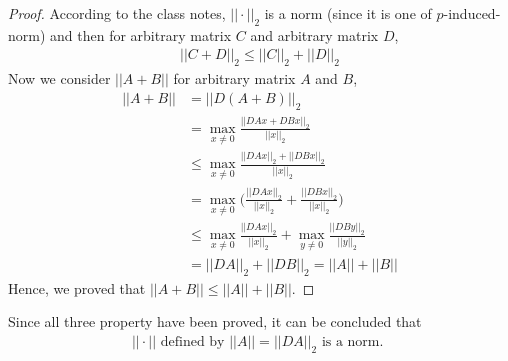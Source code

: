 \documentclass[11pt,a4paper]{article}
\begin{document}
\begin{proof}
    According to the class notes, $||\cdot||_2$ is a norm (since it is one of
    $p$-induced-norm) and then for arbitrary matrix $C$ and arbitrary matrix $D$,
    \begin{align}
        || C + D ||_2 \leq || C ||_2 + || D ||_2  \label{betaa}
    \end{align}
    Now we consider $|| A + B||$ for arbitrary matrix $A$ and $B$,
    \begin{align}     
        || A + B || &= || D (A + B) ||_2  \\
        &= \max_{x\not=0} \frac{||DAx+DBx||_2}{||x||_2} \\
        &\leq \max_{x\not=0} \frac{||DAx||_2+||DBx||_2}{||x||_2} \\
        &= \max_{x\not=0} \bigg(\frac{||DAx||_2}{||x||_2} +
        \frac{||DBx||_2}{||x||_2} \bigg) \\
        &\leq \max_{x\not=0} \frac{||DAx||_2}{||x||_2} +
        \max_{y\not=0} \frac{||DBy||_2}{||y||_2}  \\
        &= || DA ||_2 + || DB ||_2 = || A || + || B ||
    \end{align}
    Hence, we proved that $|| A + B || \leq || A || + || B ||$.
\end{proof}
Since all three property have been proved, it can be concluded that 
\begin{align}
    || \cdot || \text{ defined by $|| A || = || DA ||_2 $ is a norm. }
\end{align}

\newpage
\section{}
\end{document}
